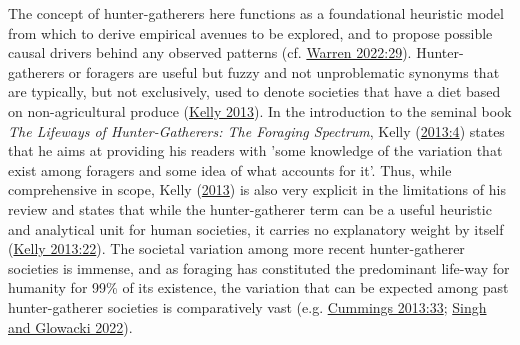 \documentclass[
  12pt,
  a4paper,
  oneside]{book}
\begin{document}
The concept of hunter-gatherers here functions as a foundational heuristic model from which to derive empirical avenues to be explored, and to propose possible causal drivers behind any observed patterns (cf. \protect\hyperlink{ref-warren2022}{Warren 2022:29}). Hunter-gatherers or foragers are useful but fuzzy and not unproblematic synonyms that are typically, but not exclusively, used to denote societies that have a diet based on non-agricultural produce (\protect\hyperlink{ref-kelly2013}{Kelly 2013}). In the introduction to the seminal book \emph{The Lifeways of Hunter-Gatherers: The Foraging Spectrum}, Kelly (\protect\hyperlink{ref-kelly2013}{2013:4}) states that he aims at providing his readers with 'some knowledge of the variation that exist among foragers and some idea of what accounts for it'. Thus, while comprehensive in scope, Kelly (\protect\hyperlink{ref-kelly2013}{2013}) is also very explicit in the limitations of his review and states that while the hunter-gatherer term can be a useful heuristic and analytical unit for human societies, it carries no explanatory weight by itself (\protect\hyperlink{ref-kelly2013}{Kelly 2013:22}). The societal variation among more recent hunter-gatherer societies is immense, and as foraging has constituted the predominant life-way for humanity for 99\% of its existence, the variation that can be expected among past hunter-gatherer societies is comparatively vast (e.g. \protect\hyperlink{ref-cummings2013}{Cummings 2013:33}; \protect\hyperlink{ref-singh2022}{Singh and Glowacki 2022}).
\end{document}
